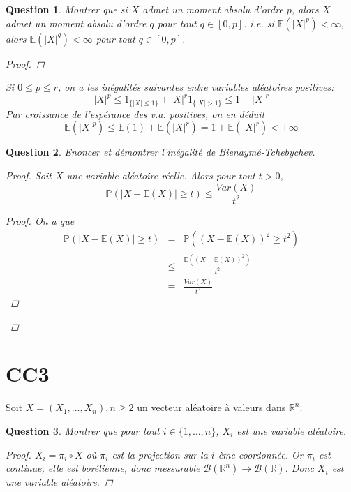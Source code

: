 \documentclass{article}
\theoremstyle{plain}
\newtheorem{question}{Question}
\begin{document}
\begin{question}
	Montrer que si $X$ admet un moment absolu d'ordre $p$, alors $X$ admet un moment absolu d'ordre $q$ pour tout $q \in [0, p]$.
	i.e. si $\mathbb{E} (|X|^p) < \infty$, alors $\mathbb{E} (|X|^q) < \infty$ pour tout $q \in [0, p]$.
	\begin{proof}
	\end{proof}
	Si $0 \leq p \leq r$, on a les inégalités suivantes entre variables aléatoires positives:
	$$|X|^p \leq \mathscr{1}_{\{|X|\leq 1\}} + |X|^r\mathscr{1}_{\{|X|>1\}} \leq 1 + |X|^r$$
	Par croissance de l’espérance des v.a. positives, on en déduit
	$$\mathbb{E}(|X|^p) \leq \mathbb{E}(1) + \mathbb{E}(|X|^r) = 1 + \mathbb{E}(|X|^r) < +\infty$$

\end{question}

\begin{question}
	Enoncer et démontrer l'inégalité de Bienaymé-Tchebychev.
	\begin{proof}
		Soit $X$ une variable aléatoire réelle. Alors pour tout $t > 0$,
		\begin{equation*}
			\mathbb{P} (|X - \mathbb{E} (X)| \geq t) \le \frac{Var(X)}{t^2}
		\end{equation*}
		\begin{proof}
			On a que
			\begin{eqnarray*}
				\mathbb{P} (|X - \mathbb{E} (X)| \geq t) &=& \mathbb{P} ((X - \mathbb{E} (X))^2 \geq t^2) \\
				&\le& \frac{\mathbb{E} ((X - \mathbb{E} (X))^2)}{t^2} \\
				&=& \frac{Var(X)}{t^2}
			\end{eqnarray*}
		\end{proof}
	\end{proof}
\end{question}



\section{CC3}

Soit $X = (X_1, \dots, X_n), n \geq 2$ un vecteur aléatoire à valeurs dans $\mathbb{R}^n$.

\begin{question}
	Montrer que pour tout $i \in \{1, \dots, n\}$, $X_i$ est une variable aléatoire.
	\begin{proof}
		$X_i = \pi_i \circ X$ où $\pi_i$ est la projection sur la $i$-ème coordonnée. Or $\pi_i$ est continue,
		elle est borélienne, donc messurable $\mathscr{B} (\mathbb{R}^n) \to \mathscr{B} (\mathbb{R})$.
		Donc $X_i$ est une variable aléatoire.
	\end{proof}
\end{question}
\end{document}
